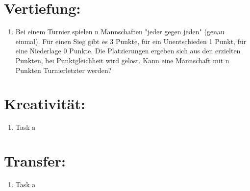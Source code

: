 



    \maketitle
    \section*{Vertiefung:}
    \begin{enumerate}[label=(\alph*)]
        \item Bei einem Turnier spielen n Mannschaften "jeder gegen jeden" (genau einmal). Für einen
		Sieg gibt es 3 Punkte, für ein Unentschieden 1 Punkt, für eine Niederlage 0 Punkte. Die
		Platzierungen ergeben sich aus den erzielten Punkten, bei Punktgleichheit wird gelost.
		Kann eine Mannschaft mit n Punkten Turnierletzter werden?
    \end{enumerate}
    \section*{Kreativität:}
    \begin{enumerate}[label=(\alph*)]
    	\item Task a
    \end{enumerate}
    \section*{Transfer:}
    \begin{enumerate}[label=(\alph*)]
    	\item Task a
    \end{enumerate}







